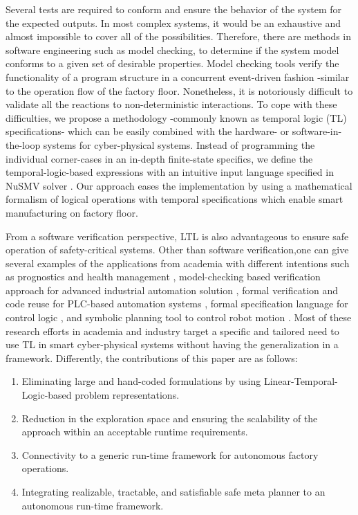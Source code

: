 \documentclass[3p,twocolumn,times,procedia]{elsarticle}
\begin{document}
Several tests are required to conform and ensure the behavior of the system for the expected outputs. In most complex systems, it would be an exhaustive and almost impossible to cover all of the possibilities. Therefore, there are methods in software engineering such as model checking, to determine if the system model conforms to a given set of desirable properties. Model checking tools verify the functionality of a program structure in a concurrent event-driven fashion -similar to the operation flow of the factory floor. Nonetheless, it is notoriously difficult to validate all the reactions to non-deterministic interactions. To cope with these difficulties, we propose a methodology -commonly known as temporal logic (TL) specifications- which can be easily combined with the hardware- or software-in-the-loop systems for cyber-physical systems. Instead of programming the individual corner-cases in an in-depth finite-state specifics, we define the temporal-logic-based expressions with an intuitive input language specified in NuSMV solver \cite{nusmv2}. Our approach eases the implementation by using a mathematical formalism of logical operations with temporal specifications which enable smart manufacturing on factory floor.

From a software verification perspective, LTL is also advantageous to ensure safe operation of safety-critical systems. Other than software verification,one can give several examples of the applications from academia with different intentions such as prognostics and health management \cite{ltl_phm}, model-checking based verification approach for advanced industrial automation solution \cite{ltl_mod}, formal verification and code reuse for PLC-based automation systems \cite{ltl_plc}, formal specification language for control logic \cite{ltl_formal}, and symbolic planning tool to control robot motion \cite{ltl_control}. 
Most of these research efforts in academia and industry target a specific and tailored need to use TL in smart cyber-physical systems without having the generalization in a framework. Differently, the contributions of this paper are as follows:
\begin{enumerate}
\item Eliminating large and hand-coded formulations by using Linear-Temporal-Logic-based problem representations.
\item Reduction in the exploration space and ensuring the scalability of the approach within an acceptable runtime requirements.
\item Connectivity to a generic run-time framework for autonomous factory operations.
\item Integrating realizable, tractable, and satisfiable safe meta planner to an autonomous run-time framework.
\end{enumerate}
\end{document}
